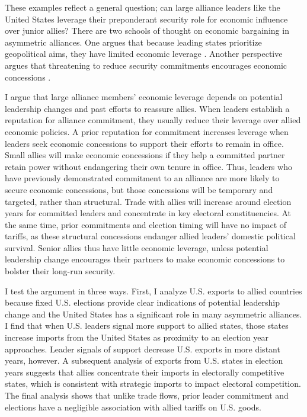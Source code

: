 \documentclass[12pt]{article}
\begin{document}
These examples reflect a general question; can large alliance leaders like the United States leverage their preponderant security role for economic influence over junior allies? 
There are two schools of thought on economic bargaining in asymmetric alliances. 
One argues that because leading states prioritize geopolitical aims, they have limited economic leverage \citep{Drezner2013, WolfordKim2017}.
Another perspective argues that threatening to reduce security commitments encourages economic concessions \citep[pg. 122]{Oatley2015}. 


I argue that large alliance members' economic leverage depends on potential leadership changes and past efforts to reassure allies.
When leaders establish a reputation for alliance commitment, they usually reduce their leverage over allied economic policies. 
A prior reputation for commitment increases leverage when leaders seek economic concessions to support their efforts to remain in office. 
Small allies will make economic concessions if they help a committed partner retain power without endangering their own tenure in office.  
Thus, leaders who have previously demonstrated commitment to an alliance are more likely to secure economic concessions, but those concessions will be temporary and targeted, rather than structural.
Trade with allies will increase around election years for committed leaders and concentrate in key electoral constituencies. 
At the same time, prior commitments and election timing will have no impact of tariffs, as these structural concessions endanger allied leaders' domestic political survival. 
Senior allies thus have little economic leverage, unless potential leadership change encourages their partners to make economic concessions to bolster their long-run security. 


I test the argument in three ways.
First, I analyze U.S. exports to allied countries because fixed U.S. elections provide clear indications of potential leadership change and the United States has a significant role in many asymmetric alliances. 
I find that when U.S. leaders signal more support to allied states, those states increase imports from the United States as proximity to an election year approaches. 
Leader signals of support decrease U.S. exports in more distant years, however. 
A subsequent analysis of exports from U.S. states in election years suggests that allies concentrate their imports in electorally competitive states, which is consistent with strategic imports to impact electoral competition.
The final analysis shows that unlike trade flows, prior leader commitment and elections have a negligible association with allied tariffs on U.S. goods. 
\end{document}
